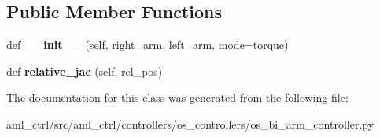 \subsection*{Public Member Functions}
\begin{DoxyCompactItemize}
\item 
\hypertarget{classaml__ctrl_1_1controllers_1_1os__controllers_1_1os__bi__arm__controller_1_1_o_s_bi_arm_controller_a8815ce807e6a1feb477311c4df629483}{}\label{classaml__ctrl_1_1controllers_1_1os__controllers_1_1os__bi__arm__controller_1_1_o_s_bi_arm_controller_a8815ce807e6a1feb477311c4df629483} 
def {\bfseries \+\_\+\+\_\+init\+\_\+\+\_\+} (self, right\+\_\+arm, left\+\_\+arm, mode=\textquotesingle{}torque\textquotesingle{})
\item 
\hypertarget{classaml__ctrl_1_1controllers_1_1os__controllers_1_1os__bi__arm__controller_1_1_o_s_bi_arm_controller_a2fff19c756aadcd75418238535c16bd9}{}\label{classaml__ctrl_1_1controllers_1_1os__controllers_1_1os__bi__arm__controller_1_1_o_s_bi_arm_controller_a2fff19c756aadcd75418238535c16bd9} 
def {\bfseries relative\+\_\+jac} (self, rel\+\_\+pos)
\end{DoxyCompactItemize}


The documentation for this class was generated from the following file\+:\begin{DoxyCompactItemize}
\item 
aml\+\_\+ctrl/src/aml\+\_\+ctrl/controllers/os\+\_\+controllers/os\+\_\+bi\+\_\+arm\+\_\+controller.\+py\end{DoxyCompactItemize}
